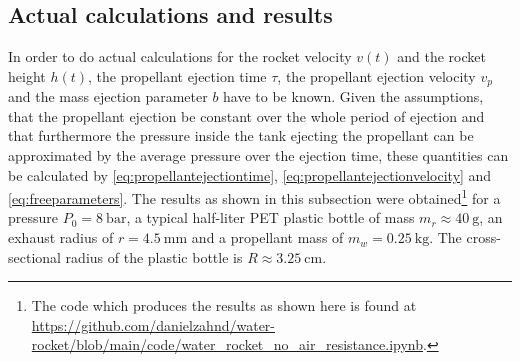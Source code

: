 \documentclass[a4paper,11pt]{report}
\begin{document}
\subsection{Actual calculations and results}
In order to do actual calculations for the rocket velocity $v(t)$ and the rocket height $h(t)$, the propellant ejection time $\tau$, the propellant ejection  velocity $v_p$ and the mass ejection parameter $b$ have to be known. Given the assumptions, that the propellant ejection be constant over the whole period of ejection and that furthermore the pressure inside the tank ejecting the propellant can be approximated by the average pressure over the ejection time, these quantities can be calculated by \cref{eq:propellantejectiontime}, \cref{eq:propellantejectionvelocity} and \cref{eq:freeparameters}. The results as shown in this subsection were obtained\footnote{The code which produces the results as shown here is found at \url{https://github.com/danielzahnd/water-rocket/blob/main/code/water_rocket_no_air_resistance.ipynb}.} for a pressure $P_0 = \SI{8}{\bar}$, a typical half-liter PET plastic bottle of mass $m_r \approx \SI{40}{\gram}$, an exhaust radius of $r = \SI{4.5}{\milli\meter}$ and a propellant mass of $m_w = \SI{0.25}{\kilo\gram}$. The cross-sectional radius of the plastic bottle is $R \approx \SI{3.25}{\centi\meter}$.
\end{document}

